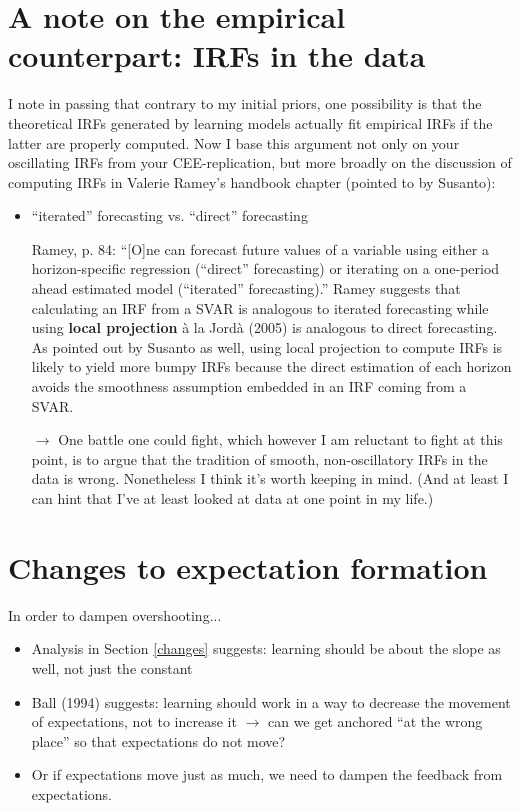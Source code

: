 \documentclass[11pt]{article}
\renewcommand{\[}{\begin{equation}}
\renewcommand{\]}{\end{equation}}
\begin{document}
\section{A note on the empirical counterpart: IRFs in the data}
I note in passing that contrary to my initial priors, one possibility is that the theoretical IRFs generated by learning models actually fit empirical IRFs if the latter are properly computed. Now I base this argument not only on your oscillating IRFs from your CEE-replication, but more broadly on the discussion of computing IRFs in Valerie Ramey's handbook chapter (pointed to by Susanto):
\begin{itemize}
\item ``iterated'' forecasting vs. ``direct'' forecasting
\item[] Ramey, p. 84: ``[O]ne can forecast future values of a variable using either a horizon-specific regression (``direct'' forecasting) or iterating on a one-period ahead estimated model (``iterated'' forecasting).'' Ramey suggests that calculating an IRF from a SVAR is analogous to iterated forecasting while using \textbf{local projection} \`{a} la Jord\`{a} (2005) is analogous to direct forecasting. As pointed out by Susanto as well, using local projection to compute IRFs is likely to yield more bumpy IRFs because the direct estimation of each horizon avoids the smoothness assumption embedded in an IRF coming from a SVAR.
\item[$\rightarrow$] One battle one could fight, which however I am reluctant to fight at this point, is to argue that the tradition of smooth, non-oscillatory IRFs in the data is wrong. Nonetheless I think it's worth keeping in mind. (And at least I can hint that I've at least looked at data at one point in my life.)
\end{itemize}

\section{Changes to expectation formation}
In order to dampen overshooting...
\begin{itemize}
\item Analysis in Section \ref{changes} suggests: learning should be about the slope as well, not just the constant
\item Ball (1994) suggests: learning should work in a way to decrease the movement of expectations, not to increase it $\rightarrow$ can we get anchored ``at the wrong place'' so that expectations do not move?
\item Or if expectations move just as much, we need to dampen the feedback from expectations.
\end{itemize}
\end{document}
